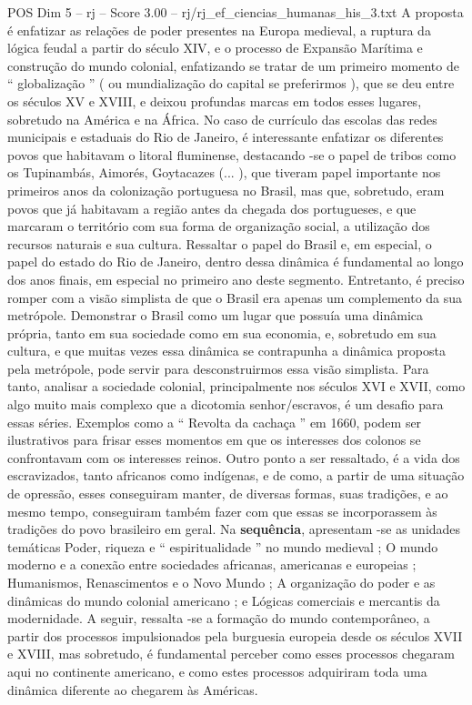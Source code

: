 \begin{textsample}{POS Dim 5 – rj – Score 3.00 – rj/rj\_ef\_ciencias\_humanas\_his\_3.txt}
A proposta é enfatizar as relações de poder presentes na Europa medieval, a ruptura da lógica feudal a partir do século XIV, e o processo de Expansão Marítima e construção do mundo colonial, enfatizando se tratar de um primeiro momento de “ globalização ” ( ou mundialização do capital se preferirmos ), que se deu entre os séculos XV e XVIII, e deixou profundas marcas em todos esses lugares, sobretudo na América e na África.
No caso de currículo das escolas das redes municipais e estaduais do Rio de Janeiro, é interessante enfatizar os diferentes povos que habitavam o litoral fluminense, destacando -se o papel de tribos como os Tupinambás, Aimorés, Goytacazes (... ), que tiveram papel importante nos primeiros anos da colonização portuguesa no Brasil, mas que, sobretudo, eram povos que já habitavam a região antes da chegada dos portugueses, e que marcaram o território com sua forma de organização social, a utilização dos recursos naturais e sua cultura.
Ressaltar o papel do Brasil e, em especial, o papel do estado do Rio de Janeiro, dentro dessa dinâmica é fundamental ao longo dos anos finais, em especial no primeiro ano deste segmento.
Entretanto, é preciso romper com a visão simplista de que o Brasil era apenas um complemento da sua metrópole.
Demonstrar o Brasil como um lugar que possuía uma dinâmica própria, tanto em sua sociedade como em sua economia, e, sobretudo em sua cultura, e que muitas vezes essa dinâmica se contrapunha a dinâmica proposta pela metrópole, pode servir para desconstruirmos essa visão simplista.
Para tanto, analisar a sociedade colonial, principalmente nos séculos XVI e XVII, como algo muito mais complexo que a dicotomia senhor/escravos, é um desafio para essas séries.
Exemplos como a “ Revolta da cachaça ” em 1660, podem ser ilustrativos para frisar esses momentos em que os interesses dos colonos se confrontavam com os interesses reinos.
Outro ponto a ser ressaltado, é a vida dos escravizados, tanto africanos como indígenas, e de como, a partir de uma situação de opressão, esses conseguiram manter, de diversas formas, suas tradições, e ao mesmo tempo, conseguiram também fazer com que essas se incorporassem às tradições do povo brasileiro em geral.
Na \textbf{sequência}, apresentam -se as unidades temáticas Poder, riqueza e “ espiritualidade ” no mundo medieval ; O mundo moderno e a conexão entre sociedades africanas, americanas e europeias ; Humanismos, Renascimentos e o Novo Mundo ; A organização do poder e as dinâmicas do mundo colonial americano ; e Lógicas comerciais e mercantis da modernidade.
A seguir, ressalta -se a formação do mundo contemporâneo, a partir dos processos impulsionados pela burguesia europeia desde os séculos XVII e XVIII, mas sobretudo, é fundamental perceber como esses processos chegaram aqui no continente americano, e como estes processos adquiriram toda uma dinâmica diferente ao chegarem às Américas.

\end{textsample}
